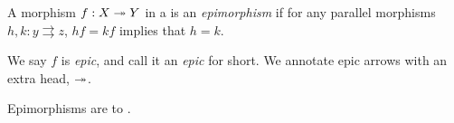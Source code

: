 


\begin{dfn*}[Epimorphism]
	A morphism $f: X\twoheadrightarrow Y$ in a  is an \emph{epimorphism} if
	for any parallel morphisms $h,k: y\rightrightarrows z$, $hf = kf$ implies that
	$h = k$.
\end{dfn*}

\begin{notation}
	We say $f$ is \emph{epic}, and call it an \emph{epic} for short. We annotate
	epic arrows with an extra head, $\twoheadrightarrow$.
\end{notation}

Epimorphisms are  to .


